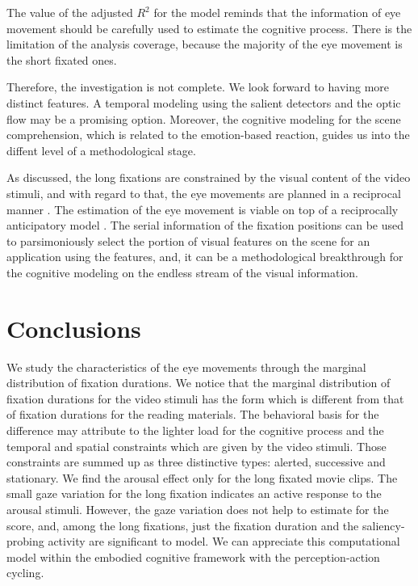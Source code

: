 \documentclass[10pt,letterpaper]{article}
\begin{document}
The value of the adjusted $R^{2}$ for the model reminds that the information of eye movement should be carefully used to estimate the cognitive process. There is the limitation of the analysis coverage, because the majority of the eye movement is the short fixated ones. 

Therefore, the investigation is not complete. We look forward to having more distinct features. A temporal modeling using the salient detectors \cite{marr1980,canny1986} and the optic flow \cite{koenderink1986} may be a promising option. Moreover, the cognitive modeling for the scene comprehension, which is related to the emotion-based reaction, guides us into the diffent level of a methodological stage. 

As discussed, the long fixations are constrained by the visual content of the video stimuli, and with regard to that, the eye movements are planned in a reciprocal manner \cite{zhang2013}. The estimation of the eye movement is viable on top of a reciprocally anticipatory model \cite{robert1985anticipatory}. The serial information of the fixation positions can be used to parsimoniously select the portion of visual features on the scene for an application using the features, and, it can be a methodological breakthrough for the cognitive modeling on the endless stream of the visual information.


\section{Conclusions}

We study the characteristics of the eye movements through the marginal distribution of fixation durations. We notice that the marginal distribution of fixation durations for the video stimuli has the form which is different from that of fixation durations for the reading materials. The behavioral basis for the difference may attribute to the lighter load for the cognitive process and the temporal and spatial constraints which are given by the video stimuli. Those constraints are summed up as three distinctive types: alerted, successive and stationary. We find the arousal effect only for the long fixated movie clips. The small gaze variation for the long fixation indicates an active response to the arousal stimuli. However, the gaze variation does not help to estimate for the score, and, among the long fixations, just the fixation duration and the saliency-probing activity are significant to model. We can appreciate this computational model within the embodied cognitive framework with the perception-action cycling.
\end{document}
